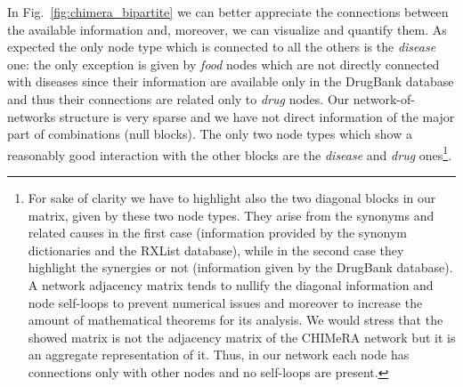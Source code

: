 \documentclass{standalone}
\begin{document}
In Fig.~\ref{fig:chimera_bipartite} we can better appreciate the connections between the available information and, moreover, we can visualize and quantify them.
As expected the only node type which is connected to all the others is the \emph{disease} one: the only exception is given by \emph{food} nodes which are not directly connected with diseases since their information are available only in the DrugBank database and thus their connections are related only to \emph{drug} nodes.
Our network-of-networks structure is very sparse and we have not direct information of the major part of combinations (null blocks).
The only two node types which show a reasonably good interaction with the other blocks are the \emph{disease} and \emph{drug} ones\footnote{
  For sake of clarity we have to highlight also the two diagonal blocks in our matrix, given by these two node types.
  They arise from the synonyms and related causes in the first case (information provided by the synonym dictionaries and the RXList database), while in the second case they highlight the synergies or not (information given by the DrugBank database).
  A network adjacency matrix tends to nullify the diagonal information and node self-loops to prevent numerical issues and moreover to increase the amount of mathematical theorems for its analysis.
  We would stress that the showed matrix is not the adjacency matrix of the \textsf{CHIMeRA} network but it is an aggregate representation of it.
  Thus, in our network each node has connections only with other nodes and no self-loops are present.
}.
\end{document}
